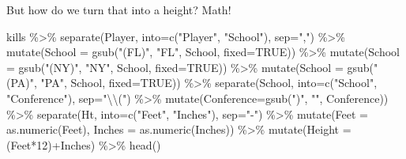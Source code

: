 \documentclass[
]{book}
\newenvironment{Shaded}{\begin{snugshade}}{\end{snugshade}}
\newcommand{\AttributeTok}[1]{\textcolor[rgb]{0.77,0.63,0.00}{#1}}
\newcommand{\ConstantTok}[1]{\textcolor[rgb]{0.00,0.00,0.00}{#1}}
\newcommand{\DecValTok}[1]{\textcolor[rgb]{0.00,0.00,0.81}{#1}}
\newcommand{\FunctionTok}[1]{\textcolor[rgb]{0.00,0.00,0.00}{#1}}
\newcommand{\NormalTok}[1]{#1}
\newcommand{\SpecialCharTok}[1]{\textcolor[rgb]{0.00,0.00,0.00}{#1}}
\newcommand{\StringTok}[1]{\textcolor[rgb]{0.31,0.60,0.02}{#1}}
\begin{document}
But how do we turn that into a height? Math!

\begin{Shaded}
\begin{Highlighting}[]
\NormalTok{kills }\SpecialCharTok{\%\textgreater{}\%} 
  \FunctionTok{separate}\NormalTok{(Player, }\AttributeTok{into=}\FunctionTok{c}\NormalTok{(}\StringTok{"Player"}\NormalTok{, }\StringTok{"School"}\NormalTok{), }\AttributeTok{sep=}\StringTok{","}\NormalTok{) }\SpecialCharTok{\%\textgreater{}\%} 
  \FunctionTok{mutate}\NormalTok{(}\AttributeTok{School =} \FunctionTok{gsub}\NormalTok{(}\StringTok{"(FL)"}\NormalTok{, }\StringTok{"FL"}\NormalTok{, School, }\AttributeTok{fixed=}\ConstantTok{TRUE}\NormalTok{)) }\SpecialCharTok{\%\textgreater{}\%}
  \FunctionTok{mutate}\NormalTok{(}\AttributeTok{School =} \FunctionTok{gsub}\NormalTok{(}\StringTok{"(NY)"}\NormalTok{, }\StringTok{"NY"}\NormalTok{, School, }\AttributeTok{fixed=}\ConstantTok{TRUE}\NormalTok{)) }\SpecialCharTok{\%\textgreater{}\%}
  \FunctionTok{mutate}\NormalTok{(}\AttributeTok{School =} \FunctionTok{gsub}\NormalTok{(}\StringTok{"(PA)"}\NormalTok{, }\StringTok{"PA"}\NormalTok{, School, }\AttributeTok{fixed=}\ConstantTok{TRUE}\NormalTok{)) }\SpecialCharTok{\%\textgreater{}\%}
  \FunctionTok{separate}\NormalTok{(School, }\AttributeTok{into=}\FunctionTok{c}\NormalTok{(}\StringTok{"School"}\NormalTok{, }\StringTok{"Conference"}\NormalTok{), }\AttributeTok{sep=}\StringTok{"}\SpecialCharTok{\textbackslash{}\textbackslash{}}\StringTok{("}\NormalTok{) }\SpecialCharTok{\%\textgreater{}\%} 
  \FunctionTok{mutate}\NormalTok{(}\AttributeTok{Conference=}\FunctionTok{gsub}\NormalTok{(}\StringTok{")"}\NormalTok{, }\StringTok{""}\NormalTok{, Conference)) }\SpecialCharTok{\%\textgreater{}\%}
  \FunctionTok{separate}\NormalTok{(Ht, }\AttributeTok{into=}\FunctionTok{c}\NormalTok{(}\StringTok{"Feet"}\NormalTok{, }\StringTok{"Inches"}\NormalTok{), }\AttributeTok{sep=}\StringTok{"{-}"}\NormalTok{) }\SpecialCharTok{\%\textgreater{}\%}
  \FunctionTok{mutate}\NormalTok{(}\AttributeTok{Feet =} \FunctionTok{as.numeric}\NormalTok{(Feet), }\AttributeTok{Inches =} \FunctionTok{as.numeric}\NormalTok{(Inches)) }\SpecialCharTok{\%\textgreater{}\%}
  \FunctionTok{mutate}\NormalTok{(}\AttributeTok{Height =}\NormalTok{ (Feet}\SpecialCharTok{*}\DecValTok{12}\NormalTok{)}\SpecialCharTok{+}\NormalTok{Inches) }\SpecialCharTok{\%\textgreater{}\%}
  \FunctionTok{head}\NormalTok{()}
\end{Highlighting}
\end{Shaded}
\end{document}
